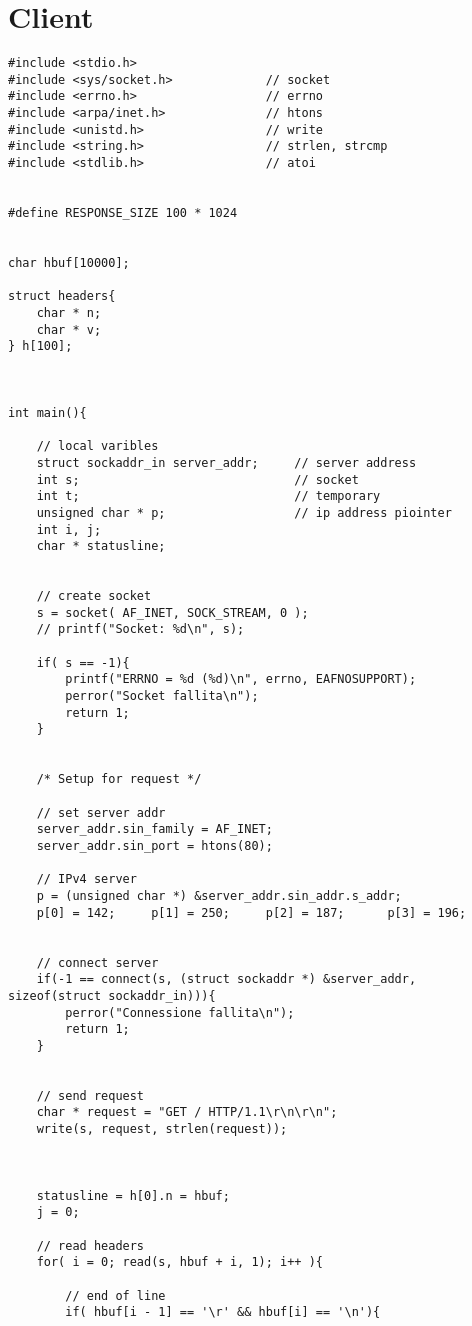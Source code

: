 \section{Client}

\begin{lstlisting}
#include <stdio.h>
#include <sys/socket.h>             // socket
#include <errno.h>                  // errno
#include <arpa/inet.h>              // htons
#include <unistd.h>                 // write
#include <string.h>                 // strlen, strcmp
#include <stdlib.h>                 // atoi


#define RESPONSE_SIZE 100 * 1024


char hbuf[10000];

struct headers{
    char * n; 
    char * v; 
} h[100];     



int main(){

    // local varibles
    struct sockaddr_in server_addr;     // server address
    int s;                              // socket
    int t;                              // temporary
    unsigned char * p;                  // ip address piointer
    int i, j;
    char * statusline;


    // create socket
    s = socket( AF_INET, SOCK_STREAM, 0 );
    // printf("Socket: %d\n", s);

    if( s == -1){
        printf("ERRNO = %d (%d)\n", errno, EAFNOSUPPORT);
        perror("Socket fallita\n");
        return 1;
    }


    /* Setup for request */

    // set server addr    
    server_addr.sin_family = AF_INET;
    server_addr.sin_port = htons(80);
    
    // IPv4 server
    p = (unsigned char *) &server_addr.sin_addr.s_addr;
    p[0] = 142;     p[1] = 250;     p[2] = 187;      p[3] = 196;


    // connect server
    if(-1 == connect(s, (struct sockaddr *) &server_addr, sizeof(struct sockaddr_in))){ 
        perror("Connessione fallita\n");
        return 1;
    }


    // send request
    char * request = "GET / HTTP/1.1\r\n\r\n";
    write(s, request, strlen(request));



    statusline = h[0].n = hbuf;
    j = 0;

    // read headers
    for( i = 0; read(s, hbuf + i, 1); i++ ){

        // end of line
        if( hbuf[i - 1] == '\r' && hbuf[i] == '\n'){
            

\end{lstlisting}
